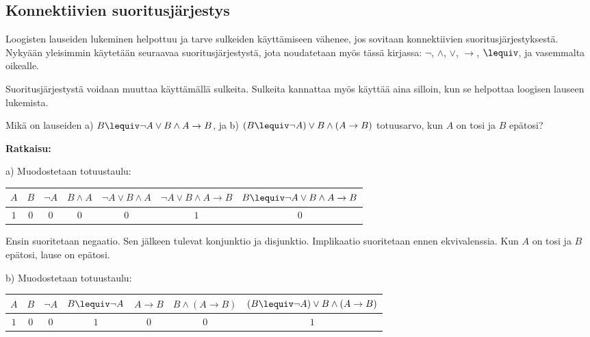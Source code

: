 \bigskip

\subsection*{Konnektiivien suoritusjärjestys} 
Loogisten lauseiden lukeminen helpottuu ja tarve sulkeiden käyttämiseen vähenee, jos sovitaan konnektiivien suoritusjärjestyksestä. Nykyään yleisimmin käytetään seuraavaa suoritusjärjestystä, jota noudatetaan myös tässä kirjassa: $\lnot$, $\land$, $\lor$, $\to$, $\lequiv$, ja vasemmalta oikealle.

Suoritusjärjestystä voidaan muuttaa käyttämällä sulkeita. Sulkeita kannattaa myös käyttää aina silloin, kun se helpottaa loogisen lauseen lukemista.

\begin{esimerkki}
Mikä on lauseiden a) $B \lequiv \lnot A\lor B \land A \to B$, ja  b)  $(B\lequiv \lnot A)\lor B \land (A\to B)$  totuusarvo, kun $A$ on tosi ja $B$ epätosi?   

{\bf Ratkaisu:}


a) Muodostetaan totuustaulu:

\begin{footnotesize}
\begin{center}
\begin{tabular}{|c|c|c|c|c|c|c|}\hline
$A$ & $B$ & $\lnot A$ & $B \land A $ & $\lnot A\lor B \land A$ & $\lnot A\lor B \land A \to B$ & $B \lequiv \lnot A\lor B \land A \to B$\\ \hline
$1$ & $0$ & $0$ & $0$ & $0$ & $1$ & $0$\\ \hline
\end{tabular}
\end{center}
\end{footnotesize}

Ensin suoritetaan negaatio. Sen jälkeen tulevat konjunktio ja disjunktio. Implikaatio 	suoritetaan ennen ekvivalenssia. 	Kun $A$ on tosi ja $B$ epätosi, lause on epätosi.


b) Muodostetaan totuustaulu:

\begin{footnotesize}
\begin{center}
\begin{tabular}{|c|c|c|c|c|c|c|}\hline
$A$ & $B$ & $\lnot A$ & $B\lequiv \lnot A$ & $A\to B$ & $B \land (A\to B)$ &  $(B\lequiv \lnot A)\lor B \land (A\to B)$\\ \hline
$1$ & $0$ & $0$ & $1$ & $0$ & $0$ & $1$\\ \hline
\end{tabular}
\end{center}
\end{footnotesize}


\end{esimerkki}
